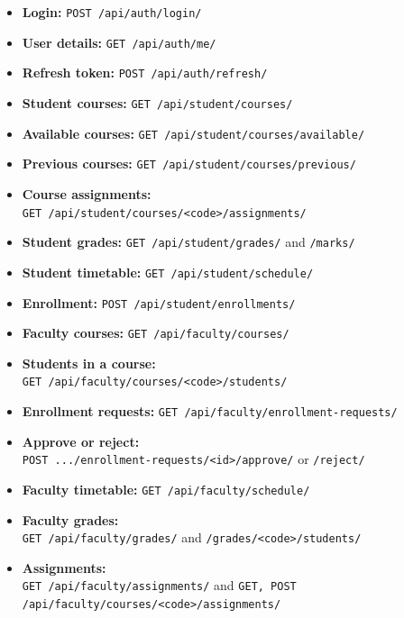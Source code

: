 \documentclass[11pt,a4paper]{article}
\begin{document}
\begin{itemize}
    \item \textbf{Login:} \texttt{POST /api/auth/login/}
    \item \textbf{User details:} \texttt{GET /api/auth/me/}
    \item \textbf{Refresh token:} \texttt{POST /api/auth/refresh/}
    \item \textbf{Student courses:} \texttt{GET /api/student/courses/}
    \item \textbf{Available courses:} \texttt{GET /api/student/courses/available/}
    \item \textbf{Previous courses:} \texttt{GET /api/student/courses/previous/}
    \item \textbf{Course assignments:}\\ \texttt{GET /api/student/courses/<code>/assignments/}
    \item \textbf{Student grades:} \texttt{GET /api/student/grades/} and
    \texttt{/marks/}
    \item \textbf{Student timetable:} \texttt{GET /api/student/schedule/}
    \item \textbf{Enrollment:} \texttt{POST /api/student/enrollments/}
    \item \textbf{Faculty courses:} \texttt{GET /api/faculty/courses/}
    \item \textbf{Students in a course:}\\ \texttt{GET /api/faculty/courses/<code>/students/}
    \item \textbf{Enrollment requests:} \texttt{GET /api/faculty/enrollment-requests/}
    \item \textbf{Approve or reject:}\\ \texttt{POST .../enrollment-requests/<id>/approve/}
    or \texttt{/reject/}
    \item \textbf{Faculty timetable:} \texttt{GET /api/faculty/schedule/}
    \item \textbf{Faculty grades:}\\ \texttt{GET /api/faculty/grades/} and
    \texttt{/grades/<code>/students/}
    \item \textbf{Assignments:}\\ \texttt{GET /api/faculty/assignments/} and
    \texttt{GET, POST /api/faculty/courses/<code>/assignments/}
\end{itemize}
\end{document}
